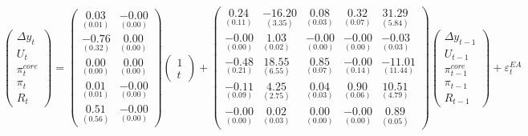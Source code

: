 \documentclass[
  11pt,
]{article}
\begin{document}
\begin{equation}
\begin{pmatrix}
 \Delta y_{t} \\
U_{t} \\
\pi^{core}_{t} \\
\pi_{t} \\
R_{t} 
\end{pmatrix} = \begin{pmatrix}
 \underset{(0.01)}{0.03} & \underset{(0.00)}{-0.00} \\
\underset{(0.32)}{-0.76} & \underset{(0.00)}{0.00} \\
\underset{(0.00)}{0.00} & \underset{(0.00)}{0.00} \\
\underset{(0.01)}{0.01} & \underset{(0.00)}{-0.00} \\
\underset{(0.56)}{0.51} & \underset{(0.00)}{-0.00} 
\end{pmatrix} \begin{pmatrix} 1 \\ t \end{pmatrix}+\begin{pmatrix}
 \underset{(0.11)}{0.24} & \underset{(3.35)}{-16.20} & \underset{(0.03)}{0.08} & \underset{(0.07)}{0.32} & \underset{(5.84)}{31.29} \\
\underset{(0.00)}{-0.00} & \underset{(0.02)}{1.03} & \underset{(0.00)}{-0.00} & \underset{(0.00)}{-0.00} & \underset{(0.03)}{-0.03} \\
\underset{(0.21)}{-0.48} & \underset{(6.55)}{18.55} & \underset{(0.07)}{0.85} & \underset{(0.14)}{-0.00} & \underset{(11.44)}{-11.01} \\
\underset{(0.09)}{-0.11} & \underset{(2.75)}{4.25} & \underset{(0.03)}{0.04} & \underset{(0.06)}{0.90} & \underset{(4.79)}{10.51} \\
\underset{(0.00)}{-0.00} & \underset{(0.03)}{0.02} & \underset{(0.00)}{0.00} & \underset{(0.00)}{-0.00} & \underset{(0.05)}{0.89} 
\end{pmatrix} \begin{pmatrix}
 \Delta y_{t - 1} \\
U_{t - 1} \\
\pi^{core}_{t - 1} \\
\pi_{t - 1} \\
R_{t - 1} 
\end{pmatrix}+ \varepsilon^{EA}_t
\label{eq:var-ea}
\end{equation}
\end{document}
